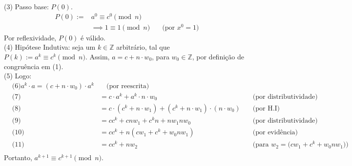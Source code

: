 \begin{enumerate}
		(3) Passo base: $P(0)$.
			\begin{align*}
				P(0) :=& a^0 \equiv c^0 \pmod{n} \\
				&\implies 1 \equiv 1 \pmod{n} &\quad \text{(por $x^0 = 1$)}
			\end{align*}
		Por reflexividade, $P(0)$ é válido. \\
		(4) Hipótese Indutiva: seja um $k \in \mathbb{Z}$ arbitrário, tal que $P(k):= a^k \equiv c^k \pmod{n}$. Assim, $a = c + n \cdot w_0$, para $w_0 \in \mathbb{Z}$, por definição de congruência em (1). \\
		(5) Logo: 
		\begin{align*}
			&\text{(6)} a^k \cdot a = (c + n \cdot w_0) \cdot a^k &\quad \text{(por reescrita)} \\ 
			&\text{(7)} &= c \cdot a^k + a^k \cdot n \cdot w_0 &\quad \text{(por distributividade)} \\
			&\text{(8)} &= c \cdot (c^k + n \cdot w_1) + (c^k + n \cdot w_1) \cdot (n \cdot w_0) &\quad \text{(por H.I)} \\
			&\text{(9)} &= cc^k + cnw_1 + c^kn + nw_1nw_0 &\quad \text{(por distributividade)} \\
			&\text{(10)} &= cc^k + n(cw_1 + c^k + w_0nw_1) &\quad \text{(por evidência)} \\
			&\text{(11)} &= cc^k + nw_2 &\quad \text{(para $w_2 = (cw_1 + c^k + w_0nw_1$))} \\
		\end{align*}
		Portanto, $a^{k+1} \equiv c^{k+1} \pmod{n}$.
\end{enumerate}


